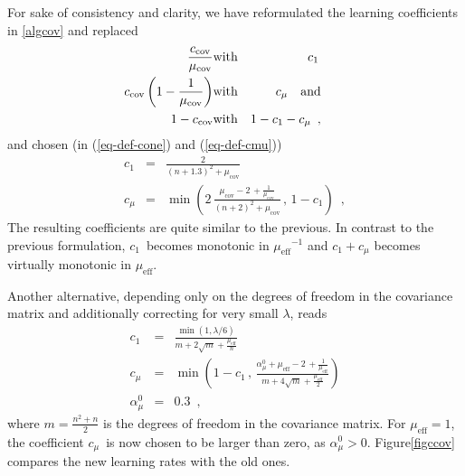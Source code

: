 \documentclass{article} %
\newcommand{\rklam}[1]{\left({#1}\right)}
\newcommand{\mueff}{\ensuremath{\mu_\mathrm{eff}}}
\newcommand{\mucov}{\mu_\mathrm{cov}}
\newcommand{\ccov}{\ensuremath{c_{\mathrm{cov}}}}
\newcommand{\cone}{\ensuremath{c_1}}
\newcommand{\cmu}{\ensuremath{c_\mu}}
\newcommand{\nref}[1]{\nolinebreak[4]\hspace{0.2845em plus0.05em minus0.17em}\nolinebreak[4]\ref{#1}}
\newcommand{\eqrefadd}[1]{(\ref{#1})} %
\newcommand{\eqsref}[1]{(\ref{#1})}
\begin{document}
\begin{appendix}
For sake of consistency and clarity, we have reformulated the learning coefficients in \eqref{algcov} and replaced
\begin{eqnarray}
 \frac{\ccov}{\mucov} &\mathrm{with}& \cone\, \\
 \hspace{-2em}\ccov\rklam{1-\frac{1}{\mucov}} &\mathrm{with}& \cmu\quad\text{and} \\
 1 - \ccov &\mathrm{with}& 1 - \cone - \cmu 
\enspace,
\end{eqnarray}
and chosen (in \eqsref{eq-def-cone} and \eqrefadd{eq-def-cmu}) 
\newcommand{\alphacmu}{\ensuremath{\alpha_\mu^0}} 
\begin{eqnarray}
  \cone &=& \frac{2}{(n+1.3)^2+\mucov} \label{eq:newfirst}\\
  \cmu &=& \min\left(2\,\frac{\mucov-2\, + 
     \frac{1}{\mucov}}{(n+2)^2 +\mucov}\,,\, 1-\cone\right) 
\enspace,
\end{eqnarray}
%
 The resulting coefficients are quite similar to the previous. In
 contrast to the previous formulation, \cone\ becomes monotonic in
 $\mueff^{-1}$ and $\cone+\cmu$ becomes virtually monotonic in
 $\mueff$. 

Another alternative, depending only on the degrees of freedom in the covariance matrix and additionally correcting for very small $\lambda$, reads 
\begin{eqnarray}
  \cone &=& \frac{\min(1,\lambda/6)}{m+2\sqrt{m}+\frac{\mueff}{n}} \label{eq:newalter}\\
  \cmu &=& \min\left(1-\cone\,,\,\frac{\alphacmu+\mueff-2\, +
     \frac{1}{\mueff}}{m +4\sqrt{m}+\frac{\mueff}{2}}\right)  \\
  \alphacmu &=& 0.3
\enspace,
\end{eqnarray}
%
where $m=\frac{n^2+n}{2}$ is the degrees of freedom in the covariance
matrix.  For $\mueff=1$, the coefficient \cmu\ is now chosen to be
larger than zero, as $\alphacmu>0$. Figure\nref{figccov} compares the
new learning rates with the old ones.


\end{appendix}
\end{document}
